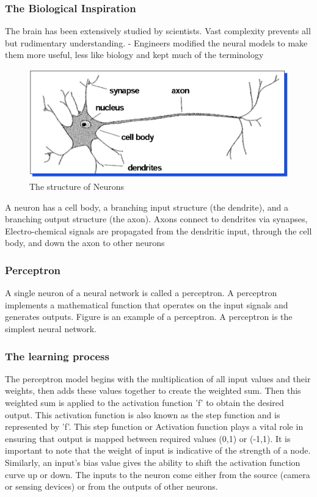 \subsubsection{The Biological Inspiration}
The brain has been extensively studied by scientists. Vast complexity prevents all but rudimentary understanding. 
- Engineers modified the neural models to make them more useful, less like biology and kept much of the terminology

\begin{figure}[H]
    \centering \includegraphics[width=0.5\linewidth]{tex/img/Structure_of_Neurons.PNG}
    \caption{The structure of Neurons}
    \label{fig:Neuron structure}
\end{figure}
A neuron has a cell body, a branching input structure (the dendrite), and a branching output structure (the axon). Axons connect to dendrites via synapses, Electro-chemical signals are propagated from the dendritic input, through the cell body, and down the axon to other neurons


\subsubsection{Perceptron}
A single neuron of a neural network is called a perceptron. A perceptron implements a mathematical function that operates on the input signals and generates outputs. Figure is an example of a perceptron. A perceptron is the simplest neural network.
\subsubsection{The learning process}
The perceptron model begins with the multiplication of all input values and their weights, then adds these values together to create the weighted sum. Then this weighted sum is applied to the activation function 'f' to obtain the desired output. This activation function is also known as the step function and is represented by 'f'. This step function or Activation function plays a vital role in ensuring that output is mapped between required values (0,1) or (-1,1). It is important to note that the weight of input is indicative of the strength of a node. Similarly, an input's bias value gives the ability to shift the activation function curve up or down.
The inputs to the neuron come either from the source (camera or sensing devices) or from the outputs of other neurons.

